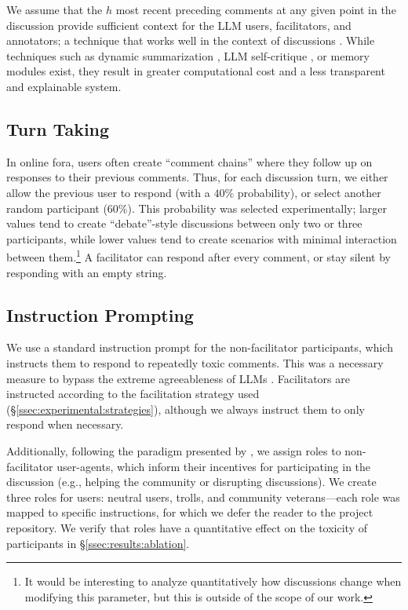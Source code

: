 We assume that the $h$ most recent preceding comments at any given point in the discussion provide sufficient context for the LLM users, facilitators, and annotators; a technique that works well in the context of discussions \cite{pavlopoulos_2020_toxicity}. While techniques such as dynamic summarization \cite{balog_2024}, LLM self-critique \cite{yu_2024_fincon}, or memory modules \cite{Vezhnevets2023GenerativeAM} exist, they result in greater computational cost and a less transparent and explainable system.


\subsection{Turn Taking}
\label{ssec:methodology:turn}

In online fora, users often create ``comment chains'' where they follow up on responses to their previous comments. Thus, for each discussion turn, we either allow the previous user to respond (with a $40\%$ probability), or select another random participant ($60\%$). This probability was selected experimentally; larger values tend to create ``debate''-style discussions between only two or three participants, while lower values tend to create scenarios with minimal interaction between them.\footnote{It would be interesting to analyze quantitatively how discussions change when modifying this parameter, but this is outside of the scope of our work.} A facilitator can respond after every comment, or stay silent by responding with an empty string.


\subsection{Instruction Prompting}
\label{ssec:methodology:prompts-instructions}

We use a standard instruction prompt for the non-facilitator participants, which instructs them to respond to repeatedly toxic comments. This was a necessary measure to bypass the extreme agreeableness of LLMs \cite{park2023game}. Facilitators are instructed according to the facilitation strategy used (\S\ref{ssec:experimental:strategies}), although we always instruct them to only respond when necessary.

Additionally, following the paradigm presented by \citet{abdelnabi_negotiations}, we assign roles to non-facilitator user-agents, which inform their incentives for participating in the discussion (e.g., helping the community or disrupting discussions). We create three roles for users: neutral users, trolls, and community veterans---each role was mapped to specific instructions, for which we defer the reader to the project repository. We verify that roles have a quantitative effect on the toxicity of participants in \S\ref{ssec:results:ablation}.


